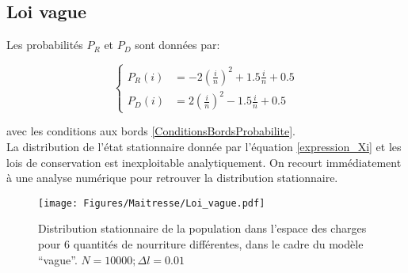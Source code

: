 \subsection{Loi vague}
Les probabilités $P_R$ et $P_D$ sont données par:

\begin{equation}
\left \{
\begin{aligned}
P_R(i) &= -2(\frac{i}{n})^2+1.5\frac{i}{n}+0.5\\
P_D(i) &= 2(\frac{i}{n})^2-1.5\frac{i}{n}+0.5
\end{aligned}
\right.
\end{equation}

avec les conditions aux bords \ref{ConditionsBordsProbabilite}.\\

La distribution de l'état stationnaire donnée par l'équation \ref{expression_Xi} et les lois de conservation est inexploitable analytiquement. On recourt immédiatement à une analyse numérique pour retrouver la distribution stationnaire.


\begin{figure}[h]
\centering
\texttt{[image: Figures/Maitresse/Loi\_vague.pdf]}
\caption{Distribution stationnaire de la population dans l'espace des charges pour 6 quantités de nourriture différentes, dans le cadre du modèle ``vague''. $N=10000; \Delta l = 0.01$}
\label{DistribAnalytiqueVague}
\end{figure}

